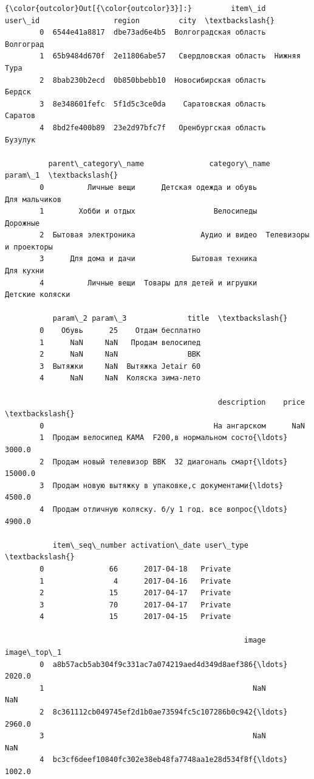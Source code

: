 \documentclass[11pt]{article}
\begin{document}
\begin{Verbatim}[commandchars=\\\{\}]
{\color{outcolor}Out[{\color{outcolor}3}]:}         item\_id       user\_id                 region         city  \textbackslash{}
        0  6544e41a8817  dbe73ad6e4b5  Волгоградская область    Волгоград   
        1  65b9484d670f  2e11806abe57   Свердловская область  Нижняя Тура   
        2  8bab230b2ecd  0b850bbebb10  Новосибирская область       Бердск   
        3  8e348601fefc  5f1d5c3ce0da    Саратовская область      Саратов   
        4  8bd2fe400b89  23e2d97bfc7f   Оренбургская область      Бузулук   
        
          parent\_category\_name               category\_name                 param\_1  \textbackslash{}
        0          Личные вещи      Детская одежда и обувь           Для мальчиков   
        1        Хобби и отдых                  Велосипеды                Дорожные   
        2  Бытовая электроника               Аудио и видео  Телевизоры и проекторы   
        3      Для дома и дачи             Бытовая техника               Для кухни   
        4          Личные вещи  Товары для детей и игрушки         Детские коляски   
        
           param\_2 param\_3              title  \textbackslash{}
        0    Обувь      25    Отдам бесплатно   
        1      NaN     NaN   Продам велосипед   
        2      NaN     NaN                BBK   
        3  Вытяжки     NaN  Вытяжка Jetair 60   
        4      NaN     NaN  Коляска зима-лето   
        
                                                 description    price  \textbackslash{}
        0                                       На ангарском      NaN   
        1  Продам велосипед KAMA  F200,в нормальном состо{\ldots}   3000.0   
        2  Продам новый телевизор BBK  32 диагональ смарт{\ldots}  15000.0   
        3  Продам новую вытяжку в упаковке,с документами{\ldots}   4500.0   
        4  Продам отличную коляску. б/у 1 год. все вопрос{\ldots}   4900.0   
        
           item\_seq\_number activation\_date user\_type  \textbackslash{}
        0               66      2017-04-18   Private   
        1                4      2017-04-16   Private   
        2               15      2017-04-17   Private   
        3               70      2017-04-17   Private   
        4               15      2017-04-15   Private   
        
                                                       image  image\_top\_1  
        0  a8b57acb5ab304f9c331ac7a074219aed4d349d8aef386{\ldots}       2020.0  
        1                                                NaN          NaN  
        2  8c361112cb049745ef2d1b0ae73594fc5c107286b0c942{\ldots}       2960.0  
        3                                                NaN          NaN  
        4  bc3cf6deef10840fc302e38eb48fa7748aa1e28d534f8f{\ldots}       1002.0  
\end{Verbatim}
            
\end{document}
